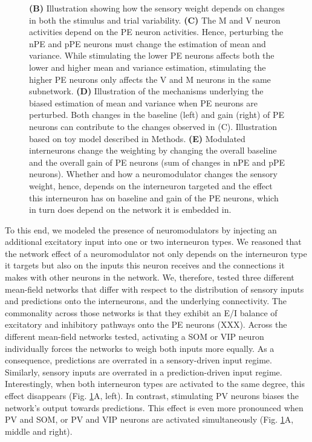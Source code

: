 \documentclass[10pt,a4paper,draft]{article}
\begin{document}
\begin{figure}[t!]
{{\bf (B)} Illustration showing how the sensory weight depends on changes in both the stimulus and trial variability.
{\bf (C)} The M and V neuron activities depend on the PE neuron activities. Hence, perturbing the nPE and pPE neurons must change the estimation of mean and variance. While stimulating the lower PE neurons affects both the lower and higher mean and variance estimation, stimulating the higher PE neurons only affects the V and M neurons in the same subnetwork.
{\bf (D)} Illustration of the mechanisms underlying the biased estimation of mean and variance when PE neurons are perturbed. Both changes in the baseline (left) and gain (right) of PE neurons can contribute to the changes observed in (C). Illustration based on toy model described in Methods.
{\bf (E)} Modulated interneurons change the weighting by changing the overall baseline and the overall gain of PE neurons (sum of changes in nPE and pPE neurons). Whether and how a neuromodulator changes the sensory weight, hence, depends on the interneuron targeted and the effect this interneuron has on baseline and gain of the PE neurons, which in turn does depend on the network it is embedded in.
}
\label{fig:Fig_4}
\end{figure}
%

To this end, we modeled the presence of neuromodulators by injecting an additional excitatory input into one or two interneuron types. We reasoned that the network effect of a neuromodulator not only depends on the interneuron type it targets but also on the inputs this neuron receives and the connections it makes with other neurons in the network. We, therefore, tested three different mean-field networks that differ with respect to the distribution of sensory inputs and predictions onto the interneurons, and the underlying connectivity. The commonality across those networks is that they exhibit an E/I balance of excitatory and inhibitory pathways onto the PE neurons (XXX). Across the different mean-field networks tested, activating a SOM or VIP neuron individually forces the networks to weigh both inputs more equally. As a consequence, predictions are overrated in a sensory-driven input regime. Similarly, sensory inputs are overrated in a prediction-driven input regime. Interestingly, when both interneuron types are activated to the same degree, this effect disappears (Fig. \ref{fig:Fig_4}A, left). In contrast, stimulating PV neurons biases the network's output towards predictions. This effect is even more pronounced when PV and SOM, or PV and VIP neurons are activated simultaneously (Fig. \ref{fig:Fig_4}A, middle and right). 
\end{document}
